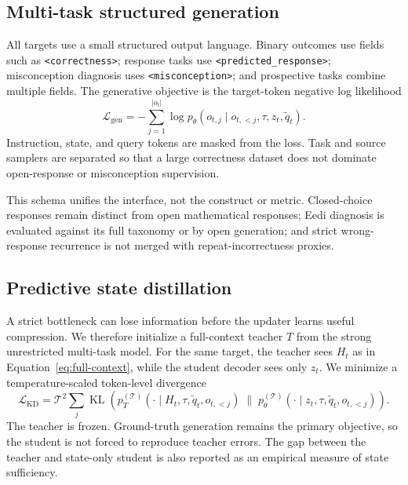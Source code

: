 \subsection{Multi-task structured generation}

All targets use a small structured output language.  Binary outcomes use
fields such as \texttt{<correctness>}; response tasks use
\texttt{<predicted\_response>}; misconception diagnosis uses
\texttt{<misconception>}; and prospective tasks combine multiple fields.  The
generative objective is the target-token negative log likelihood
\begin{equation}
    \mathcal L_{\mathrm{gen}}
    =-\sum_{j=1}^{|o_t|}\log
      p_\theta(o_{t,j}\mid o_{t,<j},\tau,z_t,\tilde q_t).
    \label{eq:gen-loss}
\end{equation}
Instruction, state, and query tokens are masked from the loss.  Task and source
samplers are separated so that a large correctness dataset does not dominate
open-response or misconception supervision.

This schema unifies the interface, not the construct or metric.  Closed-choice
responses remain distinct from open mathematical responses; Eedi diagnosis is
evaluated against its full taxonomy or by open generation; and strict
wrong-response recurrence is not merged with repeat-incorrectness proxies.

\subsection{Predictive state distillation}

A strict bottleneck can lose information before the updater learns useful
compression.  We therefore initialize a full-context teacher $T$ from the
strong unrestricted multi-task model.  For the same target, the teacher sees
$H_t$ as in Equation~\ref{eq:full-context}, while the student decoder sees only
$z_t$.  We minimize a temperature-scaled token-level divergence
\begin{equation}
    \mathcal L_{\mathrm{KD}}
    =\mathcal T^2\sum_j
      \operatorname{KL}\!\left(
      p_T^{(\mathcal T)}(\cdot\mid H_t,\tau,\tilde q_t,o_{t,<j})
      \;\|\;
      p_\theta^{(\mathcal T)}(\cdot\mid z_t,\tau,\tilde q_t,o_{t,<j})
      \right).
    \label{eq:kd-loss}
\end{equation}
The teacher is frozen.  Ground-truth generation remains the primary objective,
so the student is not forced to reproduce teacher errors.  The gap between the
teacher and state-only student is also reported as an empirical measure of
state sufficiency.

